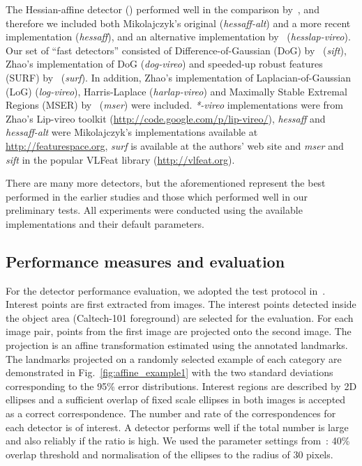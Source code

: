 \documentclass[preprint,authoryear,review]{elsarticle}
\newcommand{\commentNK}[1]{{\bf NK: #1}}
\begin{document}
The Hessian-affine detector (\cite{MikSch:2002}) performed well in the comparison 
by~\cite{MikTuySch:2005}, and therefore we 
included both Mikolajczyk's original 
(\textit{hessaff-alt}) and a more recent implementation (\textit{hessaff}),
and an alternative implementation by~\cite{lip-vireo} (\textit{hesslap-vireo}).
%
Our set of ``fast detectors'' consisted of Difference-of-Gaussian (DoG) by~\cite{Low:2004} (\textit{sift}),
Zhao's implementation of DoG (\textit{dog-vireo}) and speeded-up robust features
(SURF) by~\cite{BayEssTuy:2008} (\textit{surf}).
%
In addition, Zhao's implementation of Laplacian-of-Gaussian (LoG) (\textit{log-vireo}),
Harris-Laplace (\textit{harlap-vireo}) and Maximally Stable Extremal Regions (MSER) by~\cite{MatChuUrb:2002} (\textit{mser}) were included. \textit{*-vireo} implementations were from Zhao's
Lip-vireo toolkit (\url{http://code.google.com/p/lip-vireo/}), \textit{hessaff} and
\textit{hessaff-alt} were Mikolajczyk's implementations available at
\url{http://featurespace.org}, \textit{surf} is available at the authors' web site
and \textit{mser} and \textit{sift} in the popular VLFeat library (\url{http://vlfeat.org}).

There are many more detectors, but the aforementioned represent the best
performed in the earlier studies and those which performed well in our preliminary
tests. All experiments were conducted using the available implementations and their default parameters.

%
\subsection{Performance measures and evaluation}
%
For the detector performance evaluation, we adopted the test protocol in~\cite{MikTuySch:2005}.
Interest points are first extracted from images. The interest points detected inside the object area (Caltech-101 foreground) are selected for the evaluation.
%
For each image pair, points from the first image are projected onto the second image.
The projection is an affine transformation estimated using the annotated landmarks.
The landmarks projected on a randomly selected example of each category
are demonstrated in Fig.~\ref{fig:affine_example1} with the
two standard deviations corresponding to the 95\% error distributions.
Interest regions are described by 2D ellipses and
a sufficient overlap of fixed scale ellipses in both images is accepted as a correct correspondence.
The number and rate of the correspondences for each detector is of interest. A detector performs well
if the total number is large and also reliably if the ratio is high.
We used the parameter settings
from~\cite{MikTuySch:2005}: 40\% overlap threshold and normalisation of the ellipses to
the radius of 30 pixels. %
\end{document}
